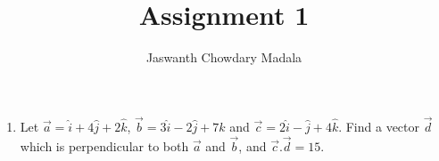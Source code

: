 \documentclass[journal,12pt,twocolumn]{IEEEtran}
\begin{document}
\vspace{3cm}


\title{Assignment 1}
\author{Jaswanth Chowdary Madala}





\maketitle

\newpage


\bigskip

\renewcommand{\thefigure}{\theenumi}
\renewcommand{\thetable}{\theenumi}

\begin{enumerate}
\item Let 	$\overrightarrow{a} = \hat{i}+4\hat{j}+2\hat{k}$, $\overrightarrow{b} = 3\hat{i}-2\hat{j}+7\hat{k}$ and 	$\overrightarrow{c} = 2\hat{i}-\hat{j}+4\hat{k}$. Find a vector $\overrightarrow{d}$ which is perpendicular to both $\overrightarrow{a}$ and $\overrightarrow{b}$, and $\overrightarrow{c}.\overrightarrow{d}=15$.


\end{enumerate}
\end{document}
